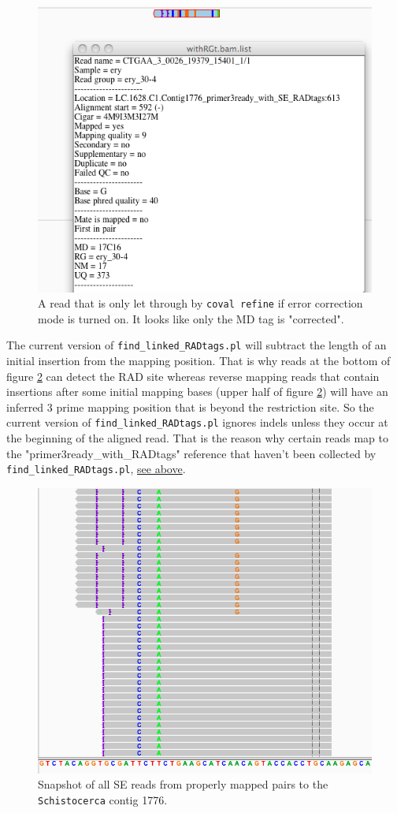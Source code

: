 \documentclass{article}\usepackage[]{graphicx}\usepackage[]{color}
\begin{document}
\begin{figure}
\centering
\includegraphics[width=.8\textwidth]{./figure/coval-refine_err-corr}
\caption{A read that is only let through by \texttt{coval refine} if error correction mode is turned on. It looks like only the MD tag is "corrected".}
\label{coval-refine_err-corr}
\end{figure}

The current version of \texttt{find\_linked\_RADtags.pl} will subtract the length of an initial insertion from the mapping position. That is why reads at the bottom of figure \ref{all_SE_pp_on_LC.1628.C1.Contig1776} can detect the RAD site whereas reverse mapping reads that contain insertions after some initial mapping bases (upper half of figure \ref{all_SE_pp_on_LC.1628.C1.Contig1776}) will have an inferred 3 prime mapping position that is beyond the restriction site. So the current version of \texttt{find\_linked\_RADtags.pl} ignores indels unless they occur at the beginning of the aligned read. That is the reason why certain reads map to the "primer3ready\_with\_RADtags" reference that haven't been collected by \texttt{find\_linked\_RADtags.pl}, \hyperlink{CCGGT}{see above}.

\begin{figure}[htb]
\centering
\includegraphics[width=.7\textwidth]{./figure/all_SE_pp_on_LC_1628_C1_Contig1776}
\caption{Snapshot of all SE reads from properly mapped pairs to the \texttt{Schistocerca} contig 1776. }
\label{all_SE_pp_on_LC.1628.C1.Contig1776}
\end{figure}
\end{document}
